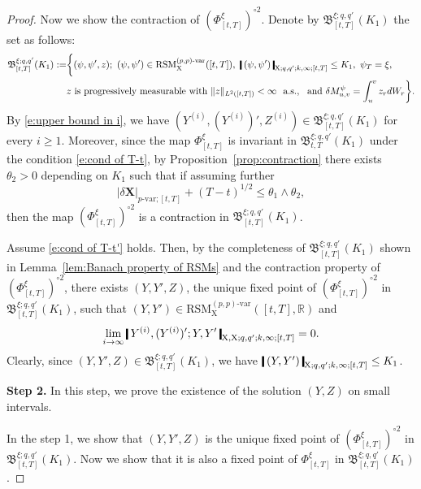 \documentclass[11pt,reqno]{amsart}
\numberwithin{equation}{section}
\def\R{\mathbb R}
\newcommand{\shortthickbar}{%
  \vcenter{\hbox{\rule{1.8pt}{2.2ex}}}%
}
\newcommand{\thicknm}[1]{%
  \mathopen{\shortthickbar}%
  \mkern4mu #1 \mkern4mu%
  \mathclose{\shortthickbar}%
}
\begin{document}
\begin{proof}
Now we show the contraction of $(\Phi^{\xi}_{[t,T]})^{\circ 2}$. Denote by $\mathfrak B^{\xi;q,q'}_{[t,T]}(K_1)$ the set as follows:  
\begin{equation*}
\begin{aligned}
\mathfrak B^{\xi;q,q'}_{[t,T]}(K_1) := &\bigg\{(\psi,\psi',z);\ (\psi,\psi') \in \mathrm{RSM}^{(p,p)\text{-}\mathrm{var}}_{\mathrm X}([t,T]),\ \thicknm{(\psi,\psi')}_{\mathrm X;q,q';k,\infty;[t,T]} \le K_1,\ \psi_{T} = \xi, \\
&z\ \text{is progressively measurable with } \|z\|_{L^2([t,T])} < \infty\ \text{ a.s.},\  \text{ and } \delta M^{\psi}_{u,v} = \int_{u}^{v} z_r dW_r \bigg\}.
\end{aligned}
\end{equation*}
By \eqref{e:upper bound in i}, we have $(Y^{(i)},(Y^{(i)})',Z^{(i)}) \in \mathfrak B^{\xi;q,q'}_{[t,T]}(K_1)$ for every $i \ge 1$. Moreover, since the map $\Phi^{\xi}_{[t,T]}$ is invariant in $\mathfrak B^{\xi;q,q'}_{t,T}(K_1)$ under the condition \eqref{e:cond of T-t}, by Proposition~\ref{prop:contraction} there exists $\theta_2 > 0$ depending on $K_1$ such that if assuming further 
\begin{equation}\label{e:cond of T-t'}
|\delta \mathbf X|_{p\text{-}\mathrm{var};[t,T]} + (T-t)^{1/2} \le \theta_1 \land \theta_2, 
\end{equation}
then the map $(\Phi^{\xi}_{[t,T]})^{\circ 2}$ is a contraction in $\mathfrak B^{\xi;q,q'}_{[t,T]}(K_1)$.

Assume \eqref{e:cond of T-t'} holds. Then, by the completeness of $\mathfrak B^{\xi;q,q'}_{[t,T]}(K_1)$ shown in Lemma~\ref{lem:Banach property of RSMs} and the contraction property of $(\Phi^{\xi}_{[t,T]})^{\circ 2}$, there exists $(Y,Y',Z)$, the unique fixed point of $(\Phi^{\xi}_{[t,T]})^{\circ 2}$ in $\mathfrak B^{\xi;q,q'}_{[t,T]}(K_1)$, such that $(Y,Y') \in \mathrm{RSM}^{(p,p)\text{-}\mathrm{var}}_{\mathrm X}([t,T],\R)$ and 
\begin{equation*}
\lim_{i \to \infty} \, \thicknm{Y^{(i)},(Y^{(i)})'; Y,Y'}_{\mathrm X,\mathrm X;q,q';k,\infty;[t,T]} = 0. 
\end{equation*}
Clearly, since $(Y,Y',Z) \in \mathfrak B^{\xi;q,q'}_{[t,T]}(K_1)$, we have $\thicknm{(Y,Y')}_{\mathrm X;q,q';k,\infty;[t,T]} \le K_1$. 


\textbf{Step 2.} In this step, we prove the existence of the solution $(Y,Z)$ on small intervals.

In the step 1, we show that $(Y,Y',Z)$ is the unique fixed point of $(\Phi^{\xi}_{[t,T]})^{\circ 2}$ in $\mathfrak B^{\xi;q,q'}_{[t,T]}(K_1)$. Now we show that it is also a fixed point of $\Phi^{\xi}_{[t,T]}$ in $\mathfrak B^{\xi;q,q'}_{[t,T]}(K_1)$. 


\end{proof}
\end{document}
